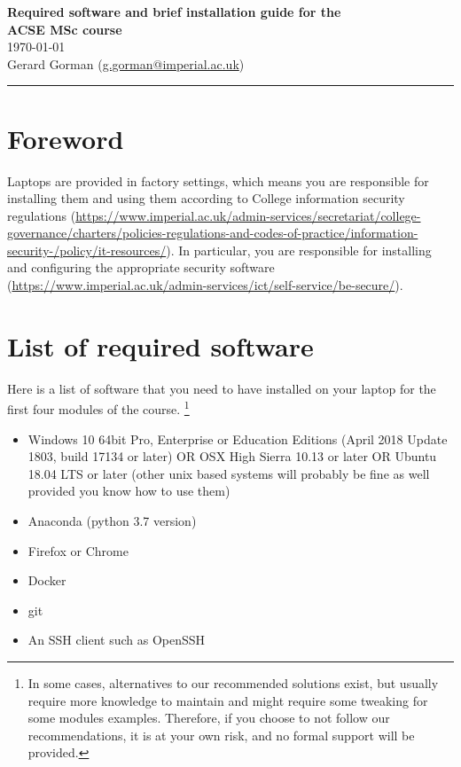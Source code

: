 \documentclass[11pt]{article}
\begin{document}
\begin{center}
{\bf \Large Required software and brief installation guide for the \\ ACSE MSc course } \\ 
\today \\
Gerard Gorman (\href{mailto:g.gorman@imperial.ac.uk}{g.gorman@imperial.ac.uk})
\end{center}
\hrule
\vspace*{1cm}


\section{Foreword}

Laptops are provided in factory settings, which means you are responsible for installing them and using them according to College information security regulations (\url{https://www.imperial.ac.uk/admin-services/secretariat/college-governance/charters/policies-regulations-and-codes-of-practice/information-security-/policy/it-resources/}). 
In particular, you are responsible for installing and configuring the appropriate security software (\url{https://www.imperial.ac.uk/admin-services/ict/self-service/be-secure/}).


\section{List of required software}

Here is a list of  software that you need to have installed on your laptop for the first four modules of the course.
\footnote{In some cases, alternatives to our recommended solutions exist, but usually require more knowledge to maintain and might require some tweaking for some modules examples. 
Therefore, if you choose to not follow our recommendations, it is at your own risk, and no formal support will be provided.}

\begin{itemize}
  \item Windows 10  64bit Pro, Enterprise or Education Editions (April 2018 Update 1803, build 17134 or later) OR OSX High Sierra 10.13 or later OR Ubuntu 18.04 LTS or later (other unix based systems will probably be fine as well provided you know how to use them)
  \item Anaconda (python 3.7 version)
  \item Firefox or Chrome
  \item Docker
  \item git
  \item An SSH client such as OpenSSH
\end{itemize}
\end{document}
